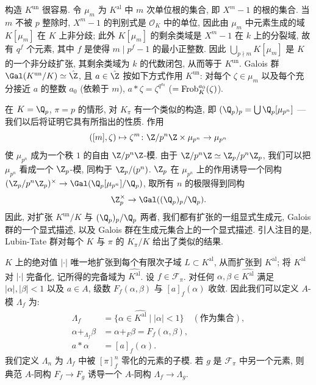 构造 $K^{\mathrm{un}}$ 很容易. 令 $\mu_m$ 为 $K^{\mathrm{al}}$ 中 $m$ 次单位根的集合, 即 $X^m-1$ 的根的集合. 当 $m$ 不被 $p$ 整除时, $X^m-1$ 的判别式是 $\mathcal{O}_K$ 中的单位, 因此由 $\mu_m$ 中元素生成的域 $K[\mu_m]$ 在 $K$ 上非分歧; 此外 $K[\mu_m]$ 的剩余类域是 $X^m-1$ 在 $k$ 上的分裂域, 故有 $q^f$ 个元素, 其中 $f$ 是使得 $m\mid p^f-1$ 的最小正整数. 因此 $\bigcup_{p\nmid m}K[\mu_m]$ 是 $K$ 的一个非分歧扩张, 其剩余类域为 $k$ 的代数闭包, 从而等于 $K^{\mathrm{un}}$. Galois 群 $\Gal(K^{\mathrm{un}}/K)\simeq\hat{\Z}$, 且 $a\in\hat{\Z}$ 按如下方式作用 $K^{\mathrm{un}}$: 对每个 $\zeta\in\mu_m$ 以及每个充分接近 $a$ 的整数 $a_0$ (依赖于 $m$), $a*\zeta=\zeta^{q^{a_0}}$ ($=\operatorname{Frob}_K^{a_0}(\zeta)$).

在 $K=\Q_p$, $\pi=p$ 的情形, 对 $K_{\pi}$ 有一个类似的构造, 即 $(\Q_p)_p=\bigcup\Q_p[\mu_{p^n}]$ — 我们以后将证明它具有所指出的性质. 作用
\[
([m],\zeta)\mapsto\zeta^m\colon\Z/p^n\Z\times\mu_{p^n}\to\mu_{p^n}
\]
使 $\mu_{p^n}$ 成为一个秩 $1$ 的自由 $\Z/p^n\Z$-模. 由于 $\Z/p^n\Z\simeq\Z_p/p^n\Z_p$, 我们可以把 $\mu_{p^n}$ 看成一个 $\Z_p$-模, 同构于 $\Z_p/(p^n)$. $\Z_p$ 在 $\mu_{p^n}$ 上的作用诱导一个同构 $(\Z_p/p^n\Z_p)^{\times}\to\Gal(\Q_p[\mu_{p^n}]/\Q_p)$, 取所有 $n$ 的极限得到同构
\[
\Z_p^{\times}\to\Gal((\Q_p)_p/\Q_p).
\]
因此, 对扩张 $K^{\mathrm{un}}/K$ 与 $(\Q_p)_p/\Q_p$ 两者, 我们都有扩张的一组显式生成元, Galois 群的一个显式描述, 以及 Galois 群在生成元集合上的一个显式描述. 引人注目的是, Lubin-Tate 群对每个 $K$ 与 $\pi$ 的 $K_{\pi}/K$ 给出了类似的结果.

$K$ 上的绝对值 $|\cdot|$ 唯一地扩张到每个有限次子域 $L\subset K^{\mathrm{al}}$, 从而扩张到 $K^{\mathrm{al}}$; 将 $K^{\mathrm{al}}$ 对 $|\cdot|$ 完备化, 记所得的完备域为 $\widehat{K^{\mathrm{al}}}$. 设 $f\in\mathcal{F}_{\pi}$. 对任何 $\alpha,\beta\in\widehat{K^{\mathrm{al}}}$ 满足 $|\alpha|,|\beta|<1$ 以及 $a\in A$, 级数 $F_f(\alpha,\beta)$ 与 $[a]_f(\alpha)$ 收敛. 因此我们可以定义 $A$-模 $\Lambda_f$ 为:
\[
\begin{aligned}
\Lambda_f&=\{\alpha\in\widehat{K^{\mathrm{al}}}\mid |\alpha|<1\}\quad(\text{作为集合}),\\
\alpha+_{\Lambda_f}\beta&=\alpha+_F\beta=F_f(\alpha,\beta),\\
a*\alpha&=[a]_f(\alpha).
\end{aligned}
\]
我们定义 $\Lambda_n$ 为 $\Lambda_f$ 中被 $[\pi]_f^n$ 零化的元素的子模. 若 $g$ 是 $\mathcal{F}_{\pi}$ 中另一个元素, 则典范 $A$-同构 $F_f\to F_g$ 诱导一个 $A$-同构 $\Lambda_f\to\Lambda_g$.

